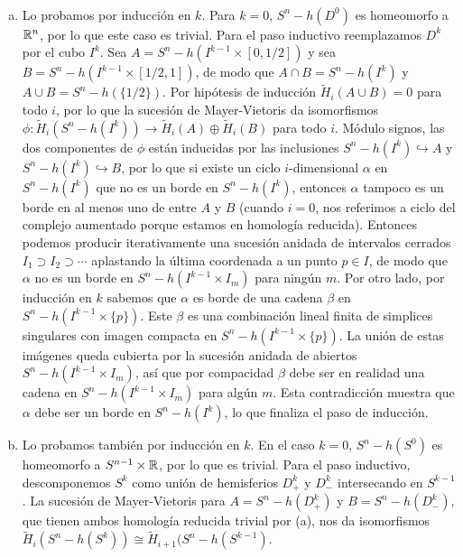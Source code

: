 \documentclass[TA.tex]{subfiles}
\begin{document}
\begin{dem}\
\begin{enumerate}[(a)]
\item Lo probamos por inducción en $k$. Para $k=0$, $S^n-h(D^0)$ es homeomorfo a $\mathbb{R}^n$, por lo que este caso es trivial. Para el paso inductivo reemplazamos $D^k$ por el cubo $I^k$. Sea $A=S^n-h(I^{k-1}\times[0,1/2])$ y sea $B=S^n-h(I^{k-1}\times[1/2,1])$, de modo que $A\cap B=S^n-h(I^k)$ y $A\cup B=S^n-h(\{1/2\})$. Por hipótesis de inducción $\widetilde{H}_i(A\cup B)=0$ para todo $i$, por lo que la sucesión de Mayer-Vietoris da isomorfismos $\phi:\widetilde{H}_i(S^n-h(I^k))\to \widetilde{H}_i(A)\oplus\widetilde{H}_i(B)$ para todo $i$. Módulo signos, las dos componentes de $\phi$ están inducidas por las inclusiones $S^n-h(I^k)\hookrightarrow A$ y $S^n-h(I^k)\hookrightarrow B$, por lo que si existe un ciclo $i$-dimensional $\alpha$ en $S^n-h(I^k)$ que no es un borde en $S^n-h(I^k)$, entonces $\alpha$ tampoco es un borde en al menos uno de entre $A$ y $B$ (cuando $i=0$, nos referimos a ciclo del complejo aumentado porque estamos en homología reducida). Entonces podemos producir iterativamente una sucesión anidada de intervalos cerrados $I_1\supset I_2\supset\cdots$ aplastando la última coordenada a un punto $p\in I$, de modo que $\alpha$ no es un borde en $S^n-h(I^{k-1}\times I_m)$ para ningún $m$. Por otro lado, por inducción en $k$ sabemos que $\alpha$ es borde de una cadena $\beta$ en $S^n-h(I^{k-1}\times\{p\})$. Este $\beta$ es una combinación lineal finita de simplices singulares con imagen compacta en $S^n-h(I^{k-1}\times\{p\})$. La unión de estas imágenes queda cubierta por la sucesión anidada de abiertos $S^n-h(I^{k-1}\times I_m)$, así que por compacidad $\beta$ debe ser en realidad una cadena en $S^n-h(I^{k-1}\times I_m)$ para algún $m$. Esta contradicción muestra que $\alpha$ debe ser un borde en $S^n-h(I^k)$, lo que finaliza el paso de inducción.

\item Lo probamos también por inducción en $k$. En el caso $k=0$, $S^n-h(S^0)$ es homeomorfo a $S^{n-1}\times\mathbb{R}$, por lo que es trivial. Para el paso inductivo, descomponemos $S^k$ como unión de hemisferios $D^k_+$ y $D^k_-$ intersecando en $S^{k-1}$. La sucesión de Mayer-Vietoris para $A=S^n-h(D^k_+)$ y $B=S^n-h(D^k_-)$, que tienen ambos homología reducida trivial por (a), nos da isomorfismos $\widetilde{H}_i(S^n-h(S^k))\cong\widetilde{H}_{i+1}(S^n-h(S^{k-1})$. 
\end{enumerate}
\end{dem}
\end{document}
